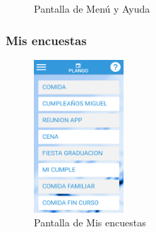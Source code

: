 \documentclass[a4paper, 12pt]{book}
\begin{document}
\begin{figure}[H]
 \centering
 \caption{Pantalla de Men\'u y Ayuda}
 \label{f:header}
\end{figure}


\subsubsection{Mis encuestas}
\label{sec:mis_encuestas}

\begin{figure}[H]
  \centering
  \includegraphics[width=0.3\textwidth]{img/mis_encuestas.png}
  \caption{Pantalla de Mis encuestas}
  \label{figura:mis_encuestas}
\end{figure}
\end{document}
